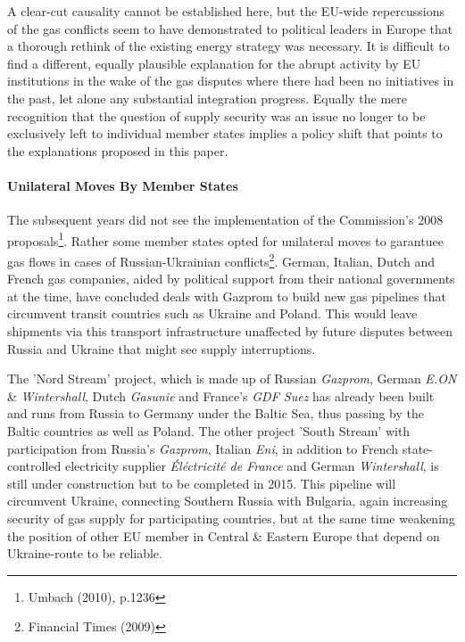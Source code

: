 \documentclass[11pt,a4paper,english]{scrreprt}
\begin{document}
A clear-cut causality cannot be established here, but the EU-wide repercussions
of the gas conflicts seem to have demonstrated to political leaders in Europe
that a thorough rethink of the existing energy strategy was necessary. It is
difficult to find a different, equally plausible explanation for the abrupt
activity by EU institutions in the wake of the gas disputes where there had
been no initiatives in the past, let alone any substantial integration
progress. Equally the mere recognition that the question of supply security was
an issue no longer to be exclusively left to individual member states implies a
policy shift that points to the explanations proposed in this paper.\par



	\paragraph{Unilateral Moves By Member States}

The subsequent years did not see the implementation of the Commission's 2008
proposals\footnote{Umbach (2010), p.1236}. Rather some member states opted for
unilateral moves to garantuee gas flows in cases of Russian-Ukrainian
conflicts\footnote{Financial Times (2009)}. German, Italian, Dutch and French
gas companies, aided by political support from their national governments at the
time, have concluded deals with Gazprom to build new gas pipelines that
circumvent transit countries such as Ukraine and Poland. This would leave
shipments via this transport infrastructure unaffected by future disputes
between Russia and Ukraine that might see supply interruptions.\par

The 'Nord Stream' project, which is made up of Russian \emph{Gazprom}, German
\emph{E.ON} \& \emph{Wintershall}, Dutch \emph{Gasunie} and France's \emph{GDF
Suez} has already been built and runs from Russia to Germany under the Baltic
Sea, thus passing by the Baltic countries as well as Poland. The other project
'South Stream' with participation from Russia's \emph{Gazprom}, Italian
\emph{Eni}, in addition to French state-controlled electricity supplier
\emph{\'{E}l\'{e}ctricit\'{e} de France} and German \emph{Wintershall}, is still
under construction but to be completed in 2015. This pipeline will circumvent
Ukraine, connecting Southern Russia with Bulgaria, again increasing security of
gas supply for participating countries, but at the same time weakening the
position of other EU member in Central \& Eastern Europe that depend on
Ukraine-route to be reliable.\par
\end{document}
